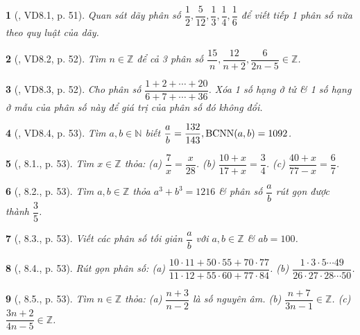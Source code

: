 \documentclass{article}
\newtheorem{baitoan}{}
\begin{document}
\begin{baitoan}[\cite{TLCT_THCS_Toan_6_so_hoc}, VD8.1, p. 51]
	Quan sát dãy phân số $\dfrac{1}{2},\dfrac{5}{12},\dfrac{1}{3},\dfrac{1}{4},\dfrac{1}{6}$ để viết tiếp 1 phân số nữa theo quy luật của dãy.
\end{baitoan}

\begin{baitoan}[\cite{TLCT_THCS_Toan_6_so_hoc}, VD8.2, p. 52]
	Tìm $n\in\mathbb{Z}$ để cả 3 phân số $\dfrac{15}{n},\dfrac{12}{n + 2},\dfrac{6}{2n - 5}\in\mathbb{Z}$.
\end{baitoan}

\begin{baitoan}[\cite{TLCT_THCS_Toan_6_so_hoc}, VD8.3, p. 52]
	Cho phân số $\dfrac{1 + 2 + \cdots + 20}{6 + 7 + \cdots + 36}$. Xóa 1 số hạng ở tử \& 1 số hạng ở mẫu của phân số này để giá trị của phân số đó không đổi.
\end{baitoan}

\begin{baitoan}[\cite{TLCT_THCS_Toan_6_so_hoc}, VD8.4, p. 53]
	Tìm $a,b\in\mathbb{N}$ biết $\dfrac{a}{b} = \dfrac{132}{143},{\rm BCNN}(a,b) = 1092$.
\end{baitoan}

\begin{baitoan}[\cite{TLCT_THCS_Toan_6_so_hoc}, 8.1., p. 53]
	Tìm $x\in\mathbb{Z}$ thỏa: (a) $\dfrac{7}{x} = \dfrac{x}{28}$. (b) $\dfrac{10 + x}{17 + x} = \dfrac{3}{4}$. (c) $\dfrac{40 + x}{77 - x} = \dfrac{6}{7}$.
\end{baitoan}

\begin{baitoan}[\cite{TLCT_THCS_Toan_6_so_hoc}, 8.2., p. 53]
	Tìm $a,b\in\mathbb{Z}$ thỏa $a^3 + b^3 = 1216$ \& phân số $\dfrac{a}{b}$ rút gọn được thành $\dfrac{3}{5}$.
\end{baitoan}

\begin{baitoan}[\cite{TLCT_THCS_Toan_6_so_hoc}, 8.3., p. 53]
	Viết các phân số tối giản $\dfrac{a}{b}$  với $a,b\in\mathbb{Z}$ \& $ab = 100$.
\end{baitoan}

\begin{baitoan}[\cite{TLCT_THCS_Toan_6_so_hoc}, 8.4., p. 53]
	Rút gọn phân số: (a) $\dfrac{10\cdot11 + 50\cdot55 + 70\cdot77}{11\cdot12 + 55\cdot60 + 77\cdot84}$. (b) $\dfrac{1\cdot3\cdot5\cdots49}{26\cdot27\cdot28\cdots50}$.
\end{baitoan}

\begin{baitoan}[\cite{TLCT_THCS_Toan_6_so_hoc}, 8.5., p. 53]
	Tìm $n\in\mathbb{Z}$ thỏa: (a) $\dfrac{n + 3}{n - 2}$ là số nguyên âm. (b) $\dfrac{n + 7}{3n - 1}\in\mathbb{Z}$. (c) $\dfrac{3n + 2}{4n - 5}\in\mathbb{Z}$.
\end{baitoan}
\end{document}
